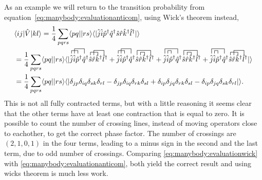 As an example we will return to the transition probability from
equation~\eqref{eq:manybody:evaluationanticom}, using Wick's theorem instead,
\begin{equation}
\begin{split}
\label{eq:manybody:evaluationwick}
&\langle ij|\hat{V}|kl \rangle = 
\frac{1}{4} \sum_{pqrs} \langle pq||rs \rangle 
\langle | \hat{j}\hat{i} 
\hat{p}^{\dagger} \hat{q}^{\dagger} \hat{s} \hat{r}
\hat{k}^{\dagger} \hat{l}^{\dagger} | \rangle \\
%
&= 
\frac{1}{4} \sum_{pqrs} \langle pq||rs \rangle \langle | 
\contraction[1ex]{}{\hat{j}}{\hat{i}}{ \hat{p}}
\contraction[1.6ex]{\hat{j}}{\hat{i}}{\hat{p}^{\dagger}}{\hat{q}}
\hat{j}\hat{i} \hat{p}^{\dagger} \hat{q}^{\dagger} 
\contraction[1ex]{}{\hat{s}}{\hat{r}}{\hat{k}}
\contraction[1.6ex]{\hat{s}}{\hat{r}}{\hat{k}^{\dagger}}{\hat{l}}
\hat{s} \hat{r}\hat{k}^{\dagger} \hat{l}^{\dagger} 
+
\contraction[1ex]{}{\hat{j}}{\hat{i}}{ \hat{p}}
\contraction[1.6ex]{\hat{j}}{\hat{i}}{\hat{p}^{\dagger}}{\hat{q}}
\hat{j}\hat{i} \hat{p}^{\dagger} \hat{q}^{\dagger} 
\contraction[1ex]{\hat{s}}{\hat{r}}{}{\hat{k}}
\contraction[1.6ex]{}{\hat{s}}{\hat{r}\hat{k}^{\dagger}}{\hat{l}}
\hat{s} \hat{r}\hat{k}^{\dagger} \hat{l}^{\dagger} 
+
\contraction[1ex]{\hat{j}}{\hat{i}}{}{ \hat{p}}
\contraction[1.6ex]{}{\hat{j}}{\hat{i}\hat{p}^{\dagger}}{\hat{q}}
\hat{j}\hat{i} \hat{p}^{\dagger} \hat{q}^{\dagger} 
\contraction[1ex]{\hat{s}}{\hat{r}}{}{\hat{k}}
\contraction[1.6ex]{}{\hat{s}}{\hat{r}\hat{k}^{\dagger}}{\hat{l}}
\hat{s} \hat{r}\hat{k}^{\dagger} \hat{l}^{\dagger} 
+
\contraction[1ex]{\hat{j}}{\hat{i}}{}{ \hat{p}}
\contraction[1.6ex]{}{\hat{j}}{\hat{i}\hat{p}^{\dagger}}{\hat{q}}
\hat{j}\hat{i} \hat{p}^{\dagger} \hat{q}^{\dagger} 
\contraction[1ex]{}{\hat{s}}{\hat{r}}{\hat{k}}
\contraction[1.6ex]{\hat{s}}{\hat{r}}{\hat{k}^{\dagger}}{\hat{l}}
\hat{s} \hat{r}\hat{k}^{\dagger} \hat{l}^{\dagger} 
| \rangle \\
%
&= 
\frac{1}{4} \sum_{pqrs} \langle pq||rs \rangle \langle |
 \delta_{jp} \delta_{iq} \delta_{sk} \delta_{rl}
- \delta_{jp} \delta_{iq} \delta_{rk} \delta_{sl}
+ \delta_{ip} \delta_{jq} \delta_{rk} \delta_{sl}
- \delta_{ip} \delta_{jq} \delta_{sk} \delta_{rl}
|\rangle .
%
\end{split}
\end{equation}
This is not all fully contracted terms, but with a little reasoning it seems
clear that the other terms have at least one contraction that is equal to zero.
It is possible to count the number of crossing lines, instead of 
moving operators close to eachother, to get the correct phase factor.
The number of crossings are $(2,1,0,1)$ in the four terms, leading to a minus
sign in the second and the last term, due to odd number of crossings.
Comparing \eqref{eq:manybody:evaluationwick} with
\eqref{eq:manybody:evaluationanticom}, both yield the correct result and
using wicks theorem is much less work.


